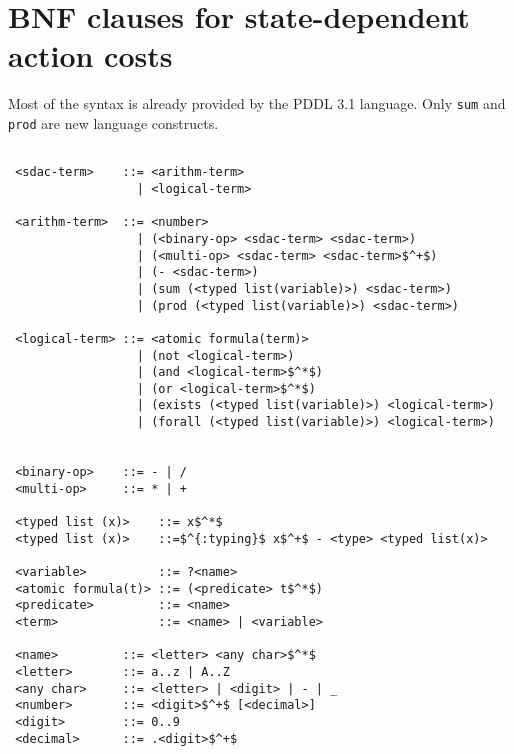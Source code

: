 \documentclass[letterpaper]{article}
\begin{document}
\section*{BNF clauses for state-dependent action costs}
Most of the syntax is already provided by the PDDL 3.1 language. Only \texttt{sum} and
\texttt{prod} are new language constructs.

\begin{lstlisting}

 <sdac-term>    ::= <arithm-term>
                  | <logical-term>

 <arithm-term>  ::= <number>
                  | (<binary-op> <sdac-term> <sdac-term>)
                  | (<multi-op> <sdac-term> <sdac-term>$^+$)
                  | (- <sdac-term>)
                  | (sum (<typed list(variable)>) <sdac-term>)
                  | (prod (<typed list(variable)>) <sdac-term>)

 <logical-term> ::= <atomic formula(term)>
                  | (not <logical-term>)
                  | (and <logical-term>$^*$)
                  | (or <logical-term>$^*$)
                  | (exists (<typed list(variable)>) <logical-term>)
                  | (forall (<typed list(variable)>) <logical-term>)


 <binary-op>    ::= - | /
 <multi-op>     ::= * | +

 <typed list (x)>    ::= x$^*$
 <typed list (x)>    ::=$^{:typing}$ x$^+$ - <type> <typed list(x)>

 <variable>          ::= ?<name>
 <atomic formula(t)> ::= (<predicate> t$^*$)
 <predicate>         ::= <name>
 <term>              ::= <name> | <variable>

 <name>         ::= <letter> <any char>$^*$
 <letter>       ::= a..z | A..Z
 <any char>     ::= <letter> | <digit> | - | _
 <number>       ::= <digit>$^+$ [<decimal>]
 <digit>        ::= 0..9
 <decimal>      ::= .<digit>$^+$


\end{lstlisting}
\end{document}
